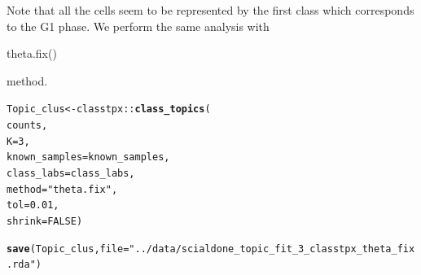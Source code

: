\documentclass[12pt]{article}\usepackage[]{graphicx}\usepackage[usenames,dvipsnames]{color}
\makeatletter
\newcommand{\hlnum}[1]{\textcolor[rgb]{0.686,0.059,0.569}{#1}}%
\newcommand{\hlstr}[1]{\textcolor[rgb]{0.192,0.494,0.8}{#1}}%
\newcommand{\hlopt}[1]{\textcolor[rgb]{0,0,0}{#1}}%
\newcommand{\hlstd}[1]{\textcolor[rgb]{0.345,0.345,0.345}{#1}}%
\newcommand{\hlkwb}[1]{\textcolor[rgb]{0.69,0.353,0.396}{#1}}%
\newcommand{\hlkwc}[1]{\textcolor[rgb]{0.333,0.667,0.333}{#1}}%
\newcommand{\hlkwd}[1]{\textcolor[rgb]{0.737,0.353,0.396}{\textbf{#1}}}%
\newenvironment{kframe}{%
 \def\at@end@of@kframe{}%
 \ifinner\ifhmode%
  \def\at@end@of@kframe{\end{minipage}}%
  \begin{minipage}{\columnwidth}%
 \fi\fi%
 \def\FrameCommand##1{\hskip\@totalleftmargin \hskip-\fboxsep
 \colorbox{shadecolor}{##1}\hskip-\fboxsep
     \hskip-\linewidth \hskip-\@totalleftmargin \hskip\columnwidth}%
 \MakeFramed {\advance\hsize-\width
   \@totalleftmargin\z@ \linewidth\hsize
   \@setminipage}}%
 {\par\unskip\endMakeFramed%
 \at@end@of@kframe}
\newenvironment{knitrout}{}{} %
\makeatother
\begin{document}
\begin{knitrout}
\end{knitrout}

Note that all the cells seem to be represented by the first class which corresponds to the G1 phase. We perform the same analysis with \begin{verb} theta.fix() \end{verb} method.

\begin{knitrout}
\color{fgcolor}\begin{kframe}
\begin{alltt}
\hlstd{Topic_clus} \hlkwb{<-} \hlstd{classtpx}\hlopt{::}\hlkwd{class_topics}\hlstd{(}
    \hlstd{counts,}
    \hlkwc{K}\hlstd{=}\hlnum{3}\hlstd{,}
    \hlkwc{known_samples} \hlstd{= known_samples,}
    \hlkwc{class_labs} \hlstd{= class_labs,}
    \hlkwc{method}\hlstd{=}\hlstr{"theta.fix"}\hlstd{,}
    \hlkwc{tol}\hlstd{=}\hlnum{0.01}\hlstd{,}
    \hlkwc{shrink}\hlstd{=}\hlnum{FALSE}\hlstd{)}

\hlkwd{save}\hlstd{(Topic_clus,} \hlkwc{file}\hlstd{=}\hlstr{"../data/scialdone_topic_fit_3_classtpx_theta_fix.rda"}\hlstd{)}
\end{alltt}
\end{kframe}
\end{knitrout}
\end{document}
